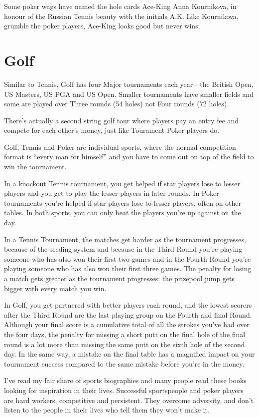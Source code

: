 Some poker wags have named the hole cards Ace-King Anna Kournikova, in
honour of the Russian Tennis beauty with the initials A.K. Like
Kournikova, grumble the poker players, Ace-King looks good but never
wins.

\section{Golf}

Similar to Tennis, Golf has four Major tournaments each
year---the British Open, US Masters, US PGA and US Open. Smaller
tournaments have smaller fields and some are played over
Three rounds (54 holes) not Four rounds (72 holes).

There's actually a second string golf tour where players pay an
entry fee and compete for each other's money, just like
Tourament Poker players do.

Golf, Tennis and Poker are individual sports, where
the normal competition format is ``every man for himself'' and
you have to come out on top of the field to win the tournament.

In a knockout Tennis tournament, you get helped
if star players lose to lesser players and you get to play the
lesser players in later rounds. In Poker tournaments you're
helped if star players lose to lesser players, often on other
tables. In both sports, you can only beat the players you're
up against on the day.

In a Tennis Tournament, the matches get harder as the tournament
progresses, because of the seeding system and because in the Third
Round you're playing someone who has also won their first two games
and in  the Fourth Round you're playing someone who has also won their
first three games. The penalty for losing a match gets greater as the
tournament progresses; the prizepool jump gets bigger with every match
you win.

In Golf, you get partnered with better players each round, and the
lowest scorers after the Third Round are the last playing group on the
Fourth and final Round. Although your final score is a cumulative
total of all the strokes you've had over the four days, the penalty
for missing a short putt on the final hole of the final round is a lot
more than missing the same putt on the sixth hole of the second day.
In the same way, a mistake on the final table has a magnified impact
on your tournament success compared to the same mistake before you're
in the money.


I've read my fair share of sports biographies and many people read
these books looking for inspiration in their lives. Successful
sportspeople and poker players are hard workers, competitive and
persistent. They overcome adversity, and don't listen to the
people in their lives who tell them they won't make it.
